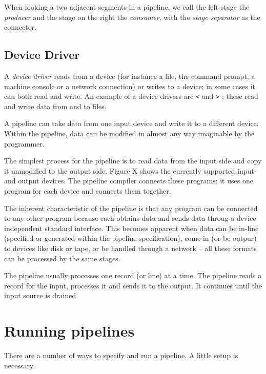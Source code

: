 When looking a two adjacent segments in a pipeline, we call the left
stage the \emph{producer} and the stage on the right the
\emph{consumer}, with the \emph{stage separator} as the connector.
\section{Device Driver}
A \emph{device driver} reads from a device (for instance a file, the
command prompt, a machine console or a network connection) or writes
to a device; in some cases it can both read and write. An example of a
device drivers are \texttt{<} and \texttt{>} ; these read and write data from and to files.

A pipeline can take data from one input device and write it to a
different device. Within the pipeline, data can be modified in almost
any way imaginable by the programmer.

The simplest process for the pipeline is to read data from the input
side and copy it unmodified to the output side. Figure X shows the
currently supported input- and output devices. The pipeline compiler
connects these programs; it uses one program for each device and
connects them together.

The inherent characteristic of the pipeline is that any program can be
connected to any other program because each obtains data and sends
data throug a device independent standard interface. This becomes
apparent when data can be in-line (specified or generated within the
pipeline specification), come in (or be outpur) to devices like disk
or tape, or be handled through a network -- all these formats can be
processed by the same stages.

The pipeline usually processes one record (or line) at a time. The
pipeline reads a record for the input, processes it and sends it to
the output. It continues until the input source is drained.

\chapter{Running pipelines}
There are a number of ways to specify and run a pipeline. A little
setup is necessary.

